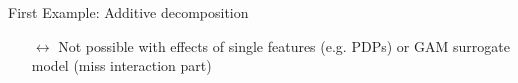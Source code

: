 \documentclass[10pt,compress,t,notes=noshow, xcolor=table]{beamer}
\newcommand{\open}{}
\newcommand{\close}{}
\begin{document}
\begin{frame}{First Example: Additive decomposition}
\begin{example}
\begin{itemize}
        \pause
        \item[$\leftrightarrow$] Not possible with effects of single features (e.g. PDPs) or GAM surrogate model (miss interaction part)
    
        
        
    \end{itemize}

    \end{example}

\end{frame}




    
\end{document}
